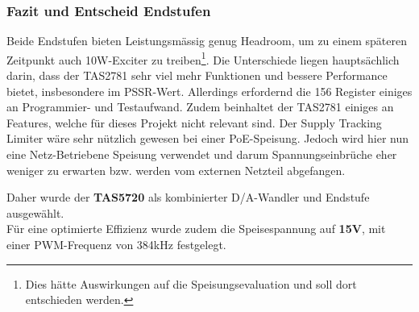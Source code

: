 \subsubsection{Fazit und Entscheid Endstufen}
Beide Endstufen bieten Leistungsmässig genug Headroom, um zu einem späteren Zeitpunkt auch 10W-Exciter zu treiben\footnote{Dies hätte Auswirkungen auf die Speisungsevaluation und soll dort entschieden werden.}. Die Unterschiede liegen hauptsächlich darin, dass der TAS2781 sehr viel mehr Funktionen und bessere Performance bietet, insbesondere im PSSR-Wert. Allerdings erfordernd die 156 Register einiges an Programmier- und Testaufwand. Zudem beinhaltet der TAS2781 einiges an Features, welche für dieses Projekt nicht relevant sind. Der Supply Tracking Limiter wäre sehr nützlich gewesen bei einer PoE-Speisung. Jedoch wird hier nun eine Netz-Betriebene Speisung verwendet und darum Spannungseinbrüche eher weniger zu erwarten bzw. werden vom externen Netzteil abgefangen.\\
\begin{center}
	\begin{minipage}{\textwidth*7/8}
		\centering
		{\large Daher wurde der \textbf{TAS5720} als kombinierter D/A-Wandler und Endstufe ausgewählt.\\
		Für eine optimierte Effizienz wurde zudem die Speisespannung auf \textbf{15V}, mit einer PWM-Frequenz von 384kHz festgelegt.}
	\end{minipage}
\end{center}